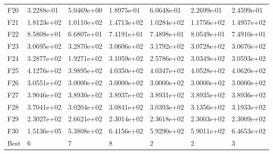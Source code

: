 \begin{tabular}{lllllll}
F20  &  3.2288e-01 &  5.0469e+00 &  1.8975e-01 &  6.0648e-01 &  2.2699e-01 &  2.4599e-01 \\
F21  &  1.8123e+02 &  1.0110e+02 &  1.4713e+02 &  1.0284e+02 &  1.1756e+02 &  1.4957e+02 \\
F22  &  8.5808e+01 &  6.6807e+01 &  7.4191e+01 &  7.4898e+01 &  8.0549e+01 &  7.4910e+01 \\
F23  &  3.0695e+02 &  3.2870e+02 &  3.0606e+02 &  3.1792e+02 &  3.0728e+02 &  3.0670e+02 \\
F24  &  3.2877e+02 &  1.9271e+02 &  3.1059e+02 &  2.5786e+02 &  3.0349e+02 &  3.0593e+02 \\
F25  &  4.1276e+02 &  3.9895e+02 &  4.0350e+02 &  4.0347e+02 &  4.0528e+02 &  4.0620e+02 \\
F26  &  3.0551e+02 &  3.0000e+02 &  3.0000e+02 &  3.0000e+02 &  3.0000e+02 &  3.0000e+02 \\
F27  &  3.9046e+02 &  3.8930e+02 &  3.8937e+02 &  3.8931e+02 &  3.8935e+02 &  3.8936e+02 \\
F28  &  3.7041e+02 &  3.0204e+02 &  3.0841e+02 &  3.0393e+02 &  3.1356e+02 &  3.1933e+02 \\
F29  &  2.3027e+02 &  2.6621e+02 &  2.3014e+02 &  2.3618e+02 &  2.3003e+02 &  2.3009e+02 \\
F30  &  1.5136e+05 &  5.3808e+02 &  6.4156e+02 &  5.9290e+02 &  5.9011e+02 &  6.4653e+02 \\
Best &           6 &           7 &           8 &           2 &           2 &           3 \\
\bottomrule
\end{tabular}
